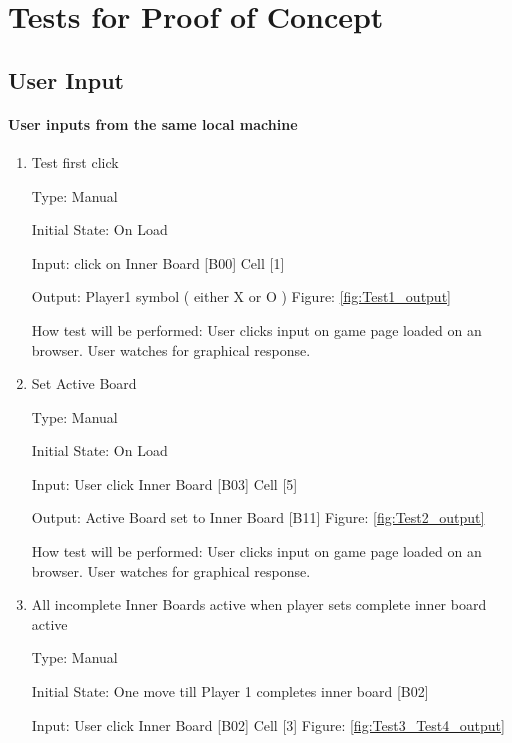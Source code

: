 \documentclass[12pt, titlepage]{article}
\begin{document}
\section{Tests for Proof of Concept} \label{POC}

\subsection{User Input}
		
\paragraph{User inputs from the same local machine}

\begin{enumerate}

\item{Test first click\\}

Type: Manual
					
Initial State: On Load
					
Input: click on Inner Board [B00] Cell [1] 
					
Output: Player1 symbol ( either X or O ) Figure: \ref{fig:Test1_output}
					
How test will be performed: User clicks input on game page loaded on an
browser. User watches for graphical response.

\item{Set Active Board\\}

Type: Manual
					
Initial State: On Load
					
Input: User click Inner Board [B03] Cell [5] 
					
Output:  Active Board set to Inner Board [B11] Figure: \ref{fig:Test2_output}
					
How test will be performed: User clicks input on game page loaded on an
browser. User watches for graphical response.


\item{All incomplete Inner Boards active when player sets complete inner board active \\}

Type: Manual
					
Initial State: One move till Player 1 completes inner board [B02]
					
Input: User click Inner Board [B02] Cell [3] Figure: \ref{fig:Test3_Test4_output}
					

\end{enumerate}
\end{document}
